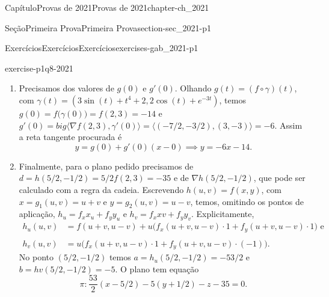\documentclass[oneside,10pt,]{book}
\numberwithin{equation}{section}
\begin{document}
\begin{chapterptx}{Capítulo}{Provas de 2021}{}{Provas de 2021}{}{}{chapter-ch_2021}
\begin{sectionptx}{Seção}{Primeira Prova}{}{Primeira Prova}{}{}{section-sec_2021-p1}
\begin{exercises-subsection-numberless}{Exercícios}{Exercícios}{}{Exercícios}{}{}{exercises-gab_2021-p1}
\begin{divisionexercise}{8}{}{}{exercise-p1q8-2021}
\begin{enumerate}[label=\alph*]
f(2,3),\big\rangle=-\).%
\item{}Precisamos dos valores de \(g(0)\) e \(g'(0)\). Olhando \(g(t)=(f\circ\gamma)(t)\), com \(\gamma(t)=(3\sin(t)+t^4+2,2\cos(t)+e^{-3t})\), temos \(g(0)=f\big(\gamma(0)\big)=f(2,3)=-14\) e \(g'(0)=big\langle\nabla
f(2,3),\gamma'(0)\big\rangle=\big\langle(-7/2,-3/2),(3,-3)\big\rangle=-6\). Assim a reta tangente procurada é%
\begin{equation*}
y=g(0)+g'(0)(x-0)\implies
y=-6x-14.
\end{equation*}
%
\item{}Finalmente, para o plano pedido precisamos de \(d=h(5/2,-1/2)=5/2f(2,3)=-35\) e de \(\nabla h(5/2,-1/2)\), que pode ser calculado com a regra da cadeia. Escrevendo \(h(u,v)=f(x,y)\), com \(x=g_1(u,v)=u+v\) e \(y=g_2(u,v)=u-v\), temos, omitindo os pontos de aplicação, \(h_u=f_x x_u+f_y y_u\) e \(h_v=f_x xv+f_y y_v\). Explicitamente,%
\begin{align*}
h_u(u,v)&=f(u+v,u-v)+u\big(f_x(u+v,u-v)\cdot
1+f_y(u+v,u-v)\cdot 1\big)\text{ e}\\\\
h_v(u,v)&=u\big(f_x(u+v,u-v)\cdot
1+f_y(u+v,u-v)\cdot(-1)\big).
\end{align*}
No ponto \((5/2,-1/2)\) temos \(a=h_u(5/2,-1/2)=-53/2\) e \(b=hv(5/2,-1/2)=-5\).  O plano tem equação%
\begin{equation*}
\pi\colon
\dfrac{53}{2}(x-5/2)-5(y+1/2)-z-35=0.
\end{equation*}
%
\end{enumerate}
\end{divisionexercise}%
\end{exercises-subsection-numberless}
\end{sectionptx}
\end{chapterptx}
%
%
\typeout{************************************************}
\typeout{************************************************}
%
\end{document}
